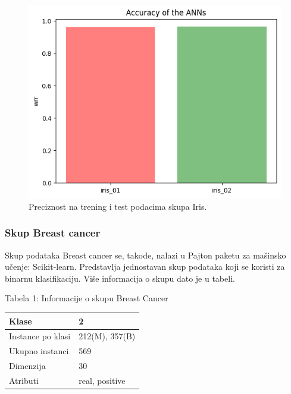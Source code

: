 \documentclass[a4paper]{article}
\begin{document}
{\begin{figure}[h!]
\begin{center}
\includegraphics[scale=0.5]{img/iriswrr.png}
\end{center}
\caption{Preciznost na trening i test podacima skupa Iris.}
\label{fig:irisslika}
\end{figure}

\subsubsection{Skup Breast cancer}
\label{breast}

Skup podataka Breast cancer se, takođe, nalazi u Pajton paketu za mašinsko učenje: Scikit-learn. Predstavlja jednostavan skup podataka koji se koristi za binarnu klasifikaciju. Više informacija o skupu dato je u tabeli.

\begin{center}
Tabela 1: Informacije o skupu Breast Cancer
\begin{tabular}{|p{4cm}|p{2cm}|}
\hline
Klase             & 2              \\ \hline
Instance po klasi & 212(M), 357(B) \\ \hline
Ukupno instanci   & 569            \\ \hline
Dimenzija         & 30             \\ \hline
Atributi          & real, positive \\ \hline
\end{tabular}\par
\bigskip
\end{center} 

}
\end{document}
